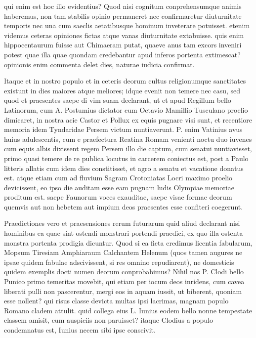  qui enim est hoc illo evidentius? Quod nisi cognitum conprehensumque animis haberemus, non tam stabilis opinio permaneret nec confirmaretur diuturnitate temporis nec una cum saeclis aetatibusque hominum inveterare potuisset. etenim videmus ceteras opiniones fictas atque vanas diuturnitate extabuisse. quis enim hippocentaurum fuisse aut Chimaeram putat, quaeve anus tam excors inveniri potest quae illa quae quondam credebantur apud inferos portenta extimescat? opinionis enim commenta delet dies, naturae iudicia confirmat.

 Itaque et in nostro populo et in ceteris deorum cultus religionumque sanctitates existunt in dies maiores atque meliores; idque evenit non temere nec casu, sed quod et praesentes saepe di vim suam declarant, ut et apud Regillum bello Latinorum, cum A. Postumius dictator cum Octavio Mamillio Tusculano proelio dimicaret, in nostra acie Castor et Pollux ex equis pugnare visi sunt, et recentiore memoria idem Tyndaridae Persem victum nuntiaverunt. P. enim Vatinius avus huius adulescentis, cum e praefectura Reatina Romam venienti noctu duo iuvenes cum equis albis dixissent regem Persem illo die captum, cum senatui nuntiavisset, primo quasi temere de re publica locutus in carcerem coniectus est, post a Paulo litteris allatis cum idem dies constitisset, et agro a senatu et vacatione donatus est. atque etiam cum ad fluvium Sagram Crotoniatas Locri maximo proelio devicissent, eo ipso die auditam esse eam pugnam ludis Olympiae memoriae proditum est. saepe Faunorum voces exauditae, saepe visae formae deorum quemvis aut non hebetem aut impium deos praesentes esse confiteri coegerunt.

 Praedictiones vero et praesensiones rerum futurarum quid aliud declarant nisi hominibus ea quae sint ostendi monstrari portendi praedici, ex quo illa ostenta monstra portenta prodigia dicuntur. Quod si ea ficta credimus licentia fabularum, Mopsum Tiresiam Amphiaraum Calchantem Helenum (quos tamen augures ne ipsae quidem fabulae adscivissent, si res omnino repudiarent), ne domesticis quidem exemplis docti numen deorum conprobabimus? Nihil nos P. Clodi bello Punico primo temeritas movebit, qui etiam per iocum deos inridens, cum cavea liberati pulli non pascerentur, mergi eos in aquam iussit, ut biberent, quoniam esse nollent? qui risus classe devicta multas ipsi lacrimas, magnam populo Romano cladem attulit. quid collega eius L. Iunius eodem bello nonne tempestate classem amisit, cum auspiciis non paruisset? itaque Clodius a populo condemnatus est, Iunius necem sibi ipse conscivit.

